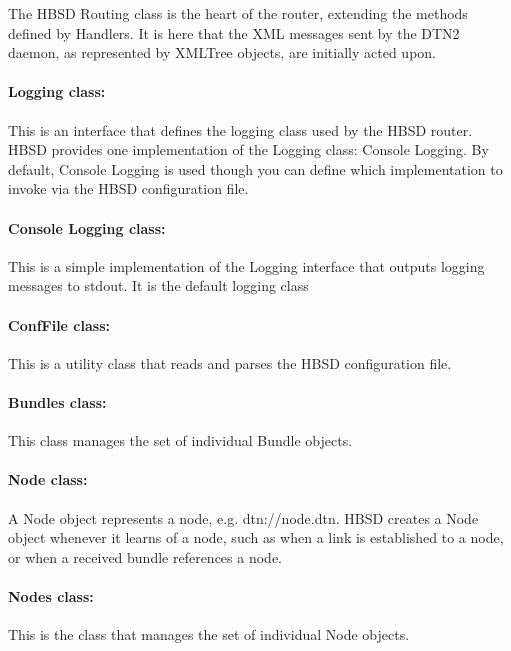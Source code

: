 The HBSD Routing class is the heart of the router, extending the methods
defined by Handlers. It is here that the XML messages sent by the DTN2 daemon, as represented by XMLTree objects, are initially acted upon.

\paragraph{Logging class:}

This is an interface that defines the logging class used by the HBSD router. HBSD provides one implementation of the Logging class: Console Logging. By default, Console Logging is used though you can define which implementation to invoke via the HBSD configuration file.

\paragraph{Console Logging class:}

This is a simple implementation of the Logging interface that outputs logging messages to stdout. It is the default logging class

\paragraph{ConfFile class:}

This is a utility class that reads and parses the HBSD configuration file.

\paragraph{Bundles class:}

This class manages the set of individual Bundle objects.

\paragraph{Node class:}

A Node object represents a node, e.g. dtn://node.dtn. HBSD creates a Node
object whenever it learns of a node, such as when a link is established to a node, or when a received bundle references a node.

\paragraph{Nodes class:}
This is the class that manages the set of individual Node objects.

